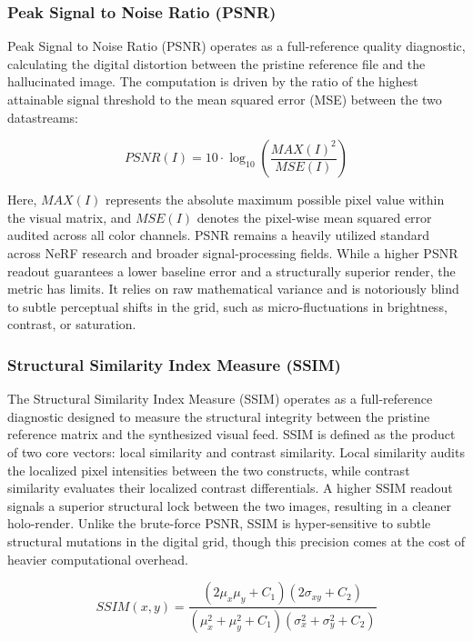 \subsubsection{Peak Signal to Noise Ratio (PSNR)}
Peak Signal to Noise Ratio (PSNR) operates as a full-reference quality diagnostic, calculating the digital distortion between the pristine reference file and the hallucinated image. The computation is driven by the ratio of the highest attainable signal threshold to the mean squared error (MSE) between the two datastreams:

\begin{equation}
PSNR(I) = 10 \cdot \log_{10} \left( \frac{MAX(I)^2}{MSE(I)} \right)
\end{equation}

Here, $MAX(I)$ represents the absolute maximum possible pixel value within the visual matrix, and $MSE(I)$ denotes the pixel-wise mean squared error audited across all color channels. PSNR remains a heavily utilized standard across NeRF research and broader signal-processing fields. While a higher PSNR readout guarantees a lower baseline error and a structurally superior render, the metric has limits. It relies on raw mathematical variance and is notoriously blind to subtle perceptual shifts in the grid, such as micro-fluctuations in brightness, contrast, or saturation.

\subsubsection{Structural Similarity Index Measure (SSIM)}
The Structural Similarity Index Measure (SSIM) operates as a full-reference diagnostic designed to measure the structural integrity between the pristine reference matrix and the synthesized visual feed. SSIM is defined as the product of two core vectors: local similarity and contrast similarity. Local similarity audits the localized pixel intensities between the two constructs, while contrast similarity evaluates their localized contrast differentials. A higher SSIM readout signals a superior structural lock between the two images, resulting in a cleaner holo-render. Unlike the brute-force PSNR, SSIM is hyper-sensitive to subtle structural mutations in the digital grid, though this precision comes at the cost of heavier computational overhead.

\begin{equation}
SSIM(x, y) = \frac{(2\mu_x\mu_y + C_1)(2\sigma_{xy} + C_2)}{(\mu_x^2 + \mu_y^2 + C_1)(\sigma_x^2 + \sigma_y^2 + C_2)}
\end{equation}

